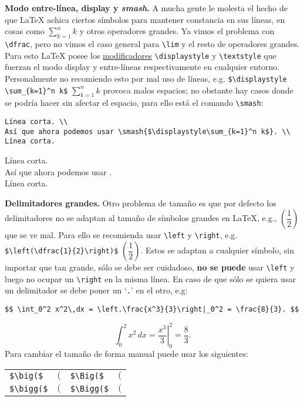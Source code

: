 \documentclass[intro-breve-latex.tex]{subfiles}
\begin{document}
\textbf{Modo entre-línea, display y \textit{smash}.}
A mucha gente le molesta el hecho de que \LaTeX{} achica ciertos símbolos para mantener constancia en sus líneas, en cosas como $\sum_{k=1}^n k$ y otros operadores grandes.
Ya vimos el problema con \lstinline|\dfrac|, pero no vimos el caso general para \lstinline|\lim| y el resto de operadores grandes.
Para esto \LaTeX{} posee los \underline{modificadores} \lstinline|\displaystyle| y \lstinline|\textstyle| que fuerzan el modo display y entre-líneas respectivamente en cualquier entorno.
Personalmente no recomiendo esto por mal uso de líneas, e.g. \lstinline|$\displaystyle \sum_{k=1}^n k$| $\displaystyle \sum_{k=1}^n k$ provoca malos espacios; no obstante hay casos donde se podría hacer sin afectar el espacio, para ello está el comando \lstinline|\smash|:
\begin{lstlisting}[basicstyle=\footnotesize\ttfamily]
Línea corta. \\
Así que ahora podemos usar \smash{$\displaystyle\sum_{k=1}^n k$}. \\
Línea corta.
\end{lstlisting}
Línea corta. \\
Así que ahora podemos usar . \\
Línea corta.

\textbf{Delimitadores grandes.} Otro problema de tamaño es que por defecto los delimitadores no se adaptan al tamaño de símbolos grandes en \LaTeX{}, e.g., $(\dfrac{1}{2})$ que se ve mal. Para ello se recomienda usar \lstinline|\left| y \lstinline|\right|, e.g. \lstinline|$\left(\dfrac{1}{2}\right)$| $\left(\dfrac{1}{2}\right)$. Estos se adaptan a cualquier símbolo, sin importar que tan grande, sólo se debe ser cuidadoso, \textbf{no se puede} usar \lstinline|\left| y luego no ocupar un \lstinline|\right| en la misma línea. En caso de que sólo se quiera usar un delimitador se debe poner un `\texttt{.}' en el otro, e.g:
\begin{lstlisting}
$$ \int_0^2 x^2\,dx = \left.\frac{x^3}{3}\right|_0^2 = \frac{8}{3}. $$
\end{lstlisting}
$$ \int_0^2 x^2\,dx = \left.\frac{x^3}{3}\right|_0^2 = \frac{8}{3}. $$
Para cambiar el tamaño de forma manual puede usar los siguientes:
\begin{center}
	\begin{tabular}{ll|ll}
		\hline \hline
		\lstinline|$\big($|  & $\big($  & \lstinline|$\Big($|  & $\Big($ \\
		\lstinline|$\bigg($| & $\bigg($ & \lstinline|$\Bigg($| & $\Bigg($ \\
		\hline \hline
	\end{tabular}
\end{center}
\end{document}
